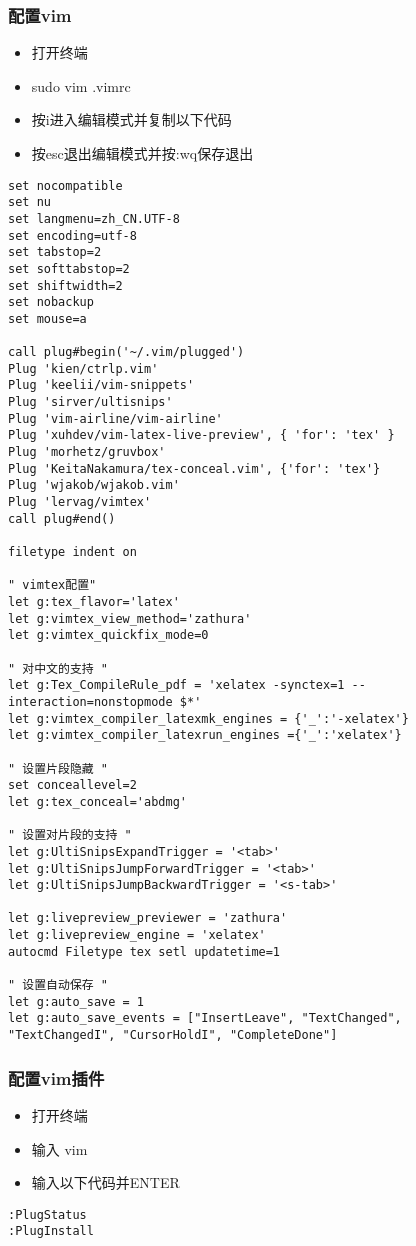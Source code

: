 \documentclass[UTF_8]{ctexart}
\begin{document}
\subsubsection{配置vim}
\begin{itemize}
		\item 打开终端
		\item sudo vim .vimrc
		\item 按i进入编辑模式并复制以下代码
		\item 按esc退出编辑模式并按:wq保存退出

\end{itemize}
\begin{lstlisting}[frame=shadowbox]
set nocompatible
set nu
set langmenu=zh_CN.UTF-8
set encoding=utf-8
set tabstop=2
set softtabstop=2
set shiftwidth=2
set nobackup
set mouse=a

call plug#begin('~/.vim/plugged')
Plug 'kien/ctrlp.vim'
Plug 'keelii/vim-snippets'
Plug 'sirver/ultisnips'
Plug 'vim-airline/vim-airline'
Plug 'xuhdev/vim-latex-live-preview', { 'for': 'tex' }
Plug 'morhetz/gruvbox'
Plug 'KeitaNakamura/tex-conceal.vim', {'for': 'tex'}
Plug 'wjakob/wjakob.vim'
Plug 'lervag/vimtex'
call plug#end()

filetype indent on

" vimtex配置"
let g:tex_flavor='latex'
let g:vimtex_view_method='zathura'
let g:vimtex_quickfix_mode=0

" 对中文的支持 "
let g:Tex_CompileRule_pdf = 'xelatex -synctex=1 --interaction=nonstopmode $*'
let g:vimtex_compiler_latexmk_engines = {'_':'-xelatex'}
let g:vimtex_compiler_latexrun_engines ={'_':'xelatex'}

" 设置片段隐藏 "
set conceallevel=2
let g:tex_conceal='abdmg'

" 设置对片段的支持 "
let g:UltiSnipsExpandTrigger = '<tab>'
let g:UltiSnipsJumpForwardTrigger = '<tab>'
let g:UltiSnipsJumpBackwardTrigger = '<s-tab>'

let g:livepreview_previewer = 'zathura'
let g:livepreview_engine = 'xelatex'
autocmd Filetype tex setl updatetime=1

" 设置自动保存 "
let g:auto_save = 1
let g:auto_save_events = ["InsertLeave", "TextChanged", "TextChangedI", "CursorHoldI", "CompleteDone"]
\end{lstlisting}

\subsubsection{配置vim插件}
\begin{itemize}
		\item 打开终端
		\item 输入 vim
		\item 输入以下代码并ENTER
		
\end{itemize}
\begin{lstlisting}[frame=shadowbox]
:PlugStatus
:PlugInstall
\end{lstlisting}
\end{document}
